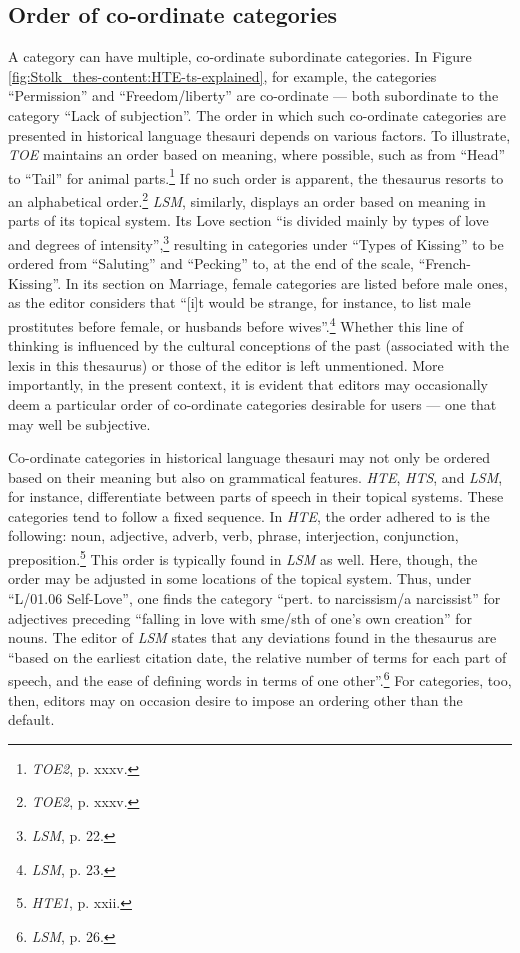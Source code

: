 \subsection{Order of co-ordinate categories}
A category can have multiple, co-ordinate subordinate categories. In Figure \ref{fig:Stolk_thes-content:HTE-ts-explained}, for example, the categories ``Permission'' and ``Freedom/liberty'' are co-ordinate --- both subordinate to the category ``Lack of subjection''.
The order in which such co-ordinate categories are presented in historical language thesauri depends on various factors. To illustrate, \textit{TOE} maintains an order based on meaning, where possible, such as from ``Head'' to ``Tail'' for animal parts.\footnote{\textit{TOE2}, p. xxxv.} If no such order is apparent, the thesaurus resorts to an alphabetical order.\footnote{\textit{TOE2}, p. xxxv.} \textit{LSM}, similarly, displays an order based on meaning in parts of its topical system. Its Love section ``is divided mainly by types of love and degrees of intensity'',\footnote{\textit{LSM}, p. 22.} resulting in categories under ``Types of Kissing'' to be ordered from ``Saluting'' and ``Pecking'' to, at the end of the scale, ``French-Kissing''. In its section on Marriage, female categories are listed before male ones, as the editor considers that ``[i]t would be strange, for instance, to list male prostitutes before female, or husbands before wives''.\footnote{\textit{LSM}, p. 23.} Whether this line of thinking is influenced by the cultural conceptions of the past (associated with the lexis in this thesaurus) or those of the editor is left unmentioned. More importantly, in the present context, it is evident that editors may occasionally deem a particular order of co-ordinate categories desirable for users --- one that may well be subjective.

Co-ordinate categories in historical language thesauri may not only be ordered based on their meaning but also on grammatical features. \textit{HTE}, \textit{HTS}, and \textit{LSM}, for instance, differentiate between parts of speech in their topical systems. These categories tend to follow a fixed sequence. In \textit{HTE}, the order adhered to is the following: noun, adjective, adverb, verb, phrase, interjection, conjunction, preposition.\footnote{\textit{HTE1}, p. xxii.} This order is typically found in \textit{LSM} as well. Here, though, the order may be adjusted in some locations of the topical system. 
Thus, under ``L/01.06 Self-Love'', one finds the category ``pert. to narcissism/a narcissist'' for adjectives preceding ``falling in love with sme/sth of one's own creation'' for nouns. The editor of \textit{LSM} states that any deviations found in the thesaurus are ``based on the earliest citation date, the relative number of terms for each part of speech, and the ease of defining words in terms of one other''.\footnote{\textit{LSM}, p. 26.} For categories, too, then, editors may on occasion desire to impose an ordering other than the default. %

